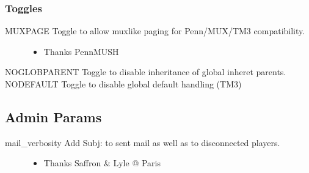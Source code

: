 \documentclass[letterpaper,10pt,english]{sphinxmanual}
\begin{document}
\subsubsection{Toggles}
\label{\detokenize{changelog:id15}}\begin{description}
\item[{MUXPAGE \sphinxhyphen{} Toggle to allow mux\sphinxhyphen{}like paging for Penn/MUX/TM3 compatibility.}] \leavevmode\begin{itemize}
\item {} 
\sphinxAtStartPar
Thanks PennMUSH

\end{itemize}

\end{description}

\sphinxAtStartPar
NOGLOBPARENT \sphinxhyphen{} Toggle to disable inheritance of global inheret parents.
NODEFAULT \sphinxhyphen{} Toggle to disable global default handling (TM3)


\subsection{Admin Params}
\label{\detokenize{changelog:id16}}\begin{description}
\item[{mail\_verbosity \sphinxhyphen{} Add Subj: to sent mail as well as to disconnected players.}] \leavevmode\begin{itemize}
\item {} 
\sphinxAtStartPar
Thanks Saffron \& Lyle @ Paris

\end{itemize}

\end{description}
\end{document}
